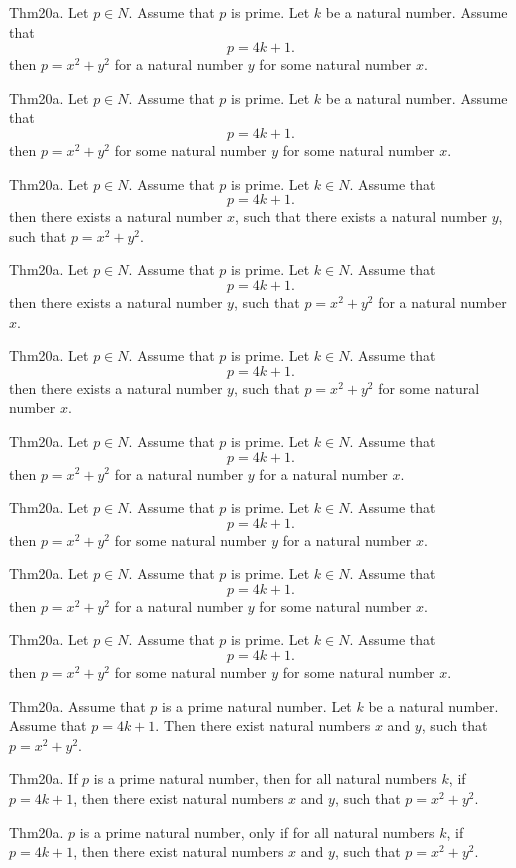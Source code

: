 \documentclass{article}
\begin{document}
Thm20a. Let $p \in N$. Assume that $p$ is prime. Let $k$ be a natural number. Assume that $$p = 4 k + 1.$$ then $p = x ^{ 2}+ y ^{ 2}$ for a natural number $y$ for some natural number $x$.

Thm20a. Let $p \in N$. Assume that $p$ is prime. Let $k$ be a natural number. Assume that $$p = 4 k + 1.$$ then $p = x ^{ 2}+ y ^{ 2}$ for some natural number $y$ for some natural number $x$.

Thm20a. Let $p \in N$. Assume that $p$ is prime. Let $k \in N$. Assume that $$p = 4 k + 1.$$ then there exists a natural number $x$, such that there exists a natural number $y$, such that $p = x ^{ 2}+ y ^{ 2}$.

Thm20a. Let $p \in N$. Assume that $p$ is prime. Let $k \in N$. Assume that $$p = 4 k + 1.$$ then there exists a natural number $y$, such that $p = x ^{ 2}+ y ^{ 2}$ for a natural number $x$.

Thm20a. Let $p \in N$. Assume that $p$ is prime. Let $k \in N$. Assume that $$p = 4 k + 1.$$ then there exists a natural number $y$, such that $p = x ^{ 2}+ y ^{ 2}$ for some natural number $x$.

Thm20a. Let $p \in N$. Assume that $p$ is prime. Let $k \in N$. Assume that $$p = 4 k + 1.$$ then $p = x ^{ 2}+ y ^{ 2}$ for a natural number $y$ for a natural number $x$.

Thm20a. Let $p \in N$. Assume that $p$ is prime. Let $k \in N$. Assume that $$p = 4 k + 1.$$ then $p = x ^{ 2}+ y ^{ 2}$ for some natural number $y$ for a natural number $x$.

Thm20a. Let $p \in N$. Assume that $p$ is prime. Let $k \in N$. Assume that $$p = 4 k + 1.$$ then $p = x ^{ 2}+ y ^{ 2}$ for a natural number $y$ for some natural number $x$.

Thm20a. Let $p \in N$. Assume that $p$ is prime. Let $k \in N$. Assume that $$p = 4 k + 1.$$ then $p = x ^{ 2}+ y ^{ 2}$ for some natural number $y$ for some natural number $x$.

Thm20a. Assume that $p$ is a prime natural number. Let $k$ be a natural number. Assume that $p = 4 k + 1$. Then there exist natural numbers $x$ and $y$, such that $p = x ^{ 2}+ y ^{ 2}$.

Thm20a. If $p$ is a prime natural number, then for all natural numbers $k$, if $p = 4 k + 1$, then there exist natural numbers $x$ and $y$, such that $p = x ^{ 2}+ y ^{ 2}$.

Thm20a. $p$ is a prime natural number, only if for all natural numbers $k$, if $p = 4 k + 1$, then there exist natural numbers $x$ and $y$, such that $p = x ^{ 2}+ y ^{ 2}$.
\end{document}
